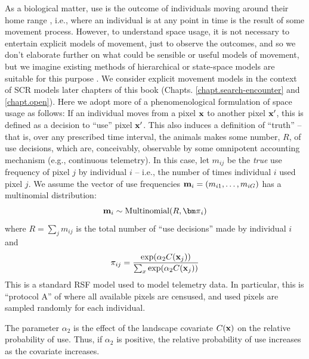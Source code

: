 As a biological matter, use is the outcome of individuals moving
around their home range \citep{hooten_etal:2010}, i.e., where an
individual is at any point in time is the result of some movement
process. However, to understand space usage, it is not necessary to
entertain explicit models of movement, just to observe the outcomes,
and so we don't elaborate further on what could be sensible or useful
models of movement, but we imagine existing methods of hierarchical or
state-space models are suitable for this purpose
\citep{ovaskainen:2004, jonsen_etal:2005, forester_etal:2007,
  ovaskainen_etal:2008, patterson_etal:2008, hooten_etal:2010,
  mcclintock_etal:2012}.  We consider explicit movement models in the
context of SCR models later chapters of this book
(Chapts. \ref{chapt.search-encounter} and \ref{chapt.open}).  Here we
adopt more of a phenomenological formulation of space usage as
follows: If an individual moves from a pixel ${\bf x}$ to another
pixel ${\bf x}'$, this is defined as a decision to ``use'' pixel ${\bf
  x}'$. This also induces a definition of ``truth'' -- that is, over
any prescribed time interval, the animals makes some number, $R$,
of use decisions, which are, conceivably, observable by some
omnipotent accounting mechanism (e.g., continuous telemetry).
In this
case, let $m_{ij}$ be the {\it true} use frequency of pixel $j$ by
individual $i$ -- i.e., the number of times individual $i$ used pixel
$j$.  We assume the vector of use frequencies ${\bf m}_{i} =
(m_{i1},\ldots,m_{iG})$ has a multinomial distribution:
\[
{\bf m}_{i} \sim \mbox{Multinomial}(R, {\bm \pi}_{i})
\]
where $R = \sum_{j} m_{ij}$ is the total number of ``use decisions''
made by individual $i$ and
\[
 \pi_{ij} = \frac{ \exp( \alpha_{2} C({\bf x}_{j}) ) }{ \sum_{x}
   \exp(\alpha_{2} C({\bf x}_{j}))}
\]
This is a standard RSF model \citep{manly_etal:2002} used to model
telemetry data. In particular, this is ``protocol A'' of
\citep{manly_etal:2002} where all available pixels are censused, and
used pixels are sampled randomly for each individual.

The parameter $\alpha_2$ is the effect of the
landscape covariate $C({\bf x})$ on the relative probability of
use. Thus, if $\alpha_2$ is positive, the relative probability of use
increases as the covariate increases.

